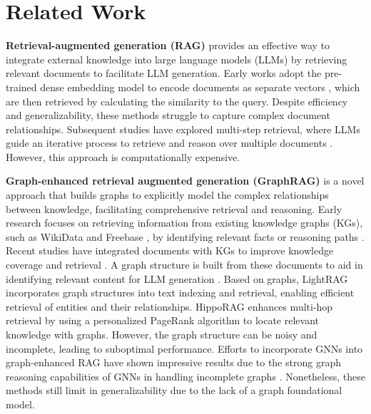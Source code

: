 
\section{Related Work}

\noindent\textbf{Retrieval-augmented generation (RAG)} \cite{gao2023retrieval} provides an effective way to integrate external knowledge into large language models (LLMs) by retrieving relevant documents to facilitate LLM generation. Early works adopt the pre-trained dense embedding model to encode documents as separate vectors \cite{karpukhin2020dense,bge_m3,li2023towards,moreira2024nv}, which are then retrieved by calculating the similarity to the query. Despite efficiency and generalizability, these methods struggle to capture complex document relationships. Subsequent studies have explored multi-step retrieval, where LLMs guide an iterative process to retrieve and reason over multiple documents \cite{trivedi2023interleaving,jiang2023active,su-etal-2024-dragin}. However, this approach is computationally expensive. 

\noindent\textbf{Graph-enhanced retrieval augmented generation (GraphRAG)} \cite{peng2024graph,han2024retrieval} is a novel approach that builds graphs to explicitly model the complex relationships between knowledge, facilitating comprehensive retrieval and reasoning. Early research focuses on retrieving information from existing knowledge graphs (KGs), such as WikiData \cite{vrandevcic2014wikidata} and Freebase \cite{bollacker2008freebase}, by identifying relevant facts or reasoning paths \cite{li2023graph,luoreasoning}. Recent studies have integrated documents with KGs to improve knowledge coverage and retrieval \cite{edge2024local,liang2024kag}. A graph structure is built from these documents to aid in identifying relevant content for LLM generation \cite{dong2024don}. Based on graphs, LightRAG \cite{guo2024lightrag} incorporates graph structures into text indexing and retrieval, enabling efficient retrieval of entities and their relationships.
HippoRAG \cite{gutiérrez2024hipporag} enhances multi-hop retrieval by using a personalized PageRank algorithm to locate relevant knowledge with graphs. However, the graph structure can be noisy and incomplete, leading to suboptimal performance. Efforts to incorporate GNNs into graph-enhanced RAG \cite{mavromatis2024gnn,he2024g} have shown impressive results due to the strong graph reasoning capabilities of GNNs in handling incomplete graphs \cite{galkintowards}. Nonetheless, these methods still limit in generalizability due to the lack of a graph foundational model.

